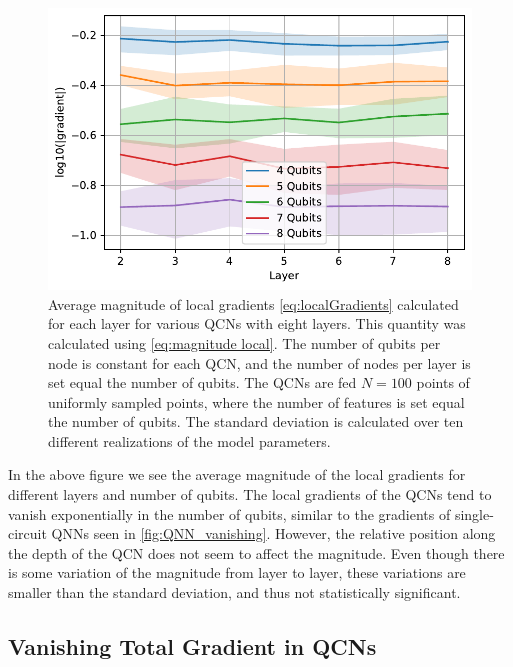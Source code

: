 \begin{figure}[H]
    \centering
    \includegraphics[width=12cm]{latex/figures/vanishing_gradient_partial_input.pdf}
    \caption{Average magnitude of local gradients \cref{eq:localGradients} calculated for each layer for various QCNs with eight layers. This quantity was calculated using \cref{eq:magnitude local}. The number of qubits per node is constant for each QCN, and the number of nodes per layer is set equal the number of qubits. The QCNs are fed $N=100$ points of uniformly sampled points, where the number of features is set equal the number of qubits. The standard deviation is calculated over ten different realizations of the model parameters.}
    \label{fig:QCN_local_vanishing}
\end{figure}

In the above figure we see the average magnitude of the local gradients for different layers and number of qubits. The local gradients of the QCNs tend to vanish exponentially in the number of qubits, similar to the gradients of single-circuit QNNs seen in \cref{fig:QNN_vanishing}. However, the relative position along the depth of the QCN does not seem to affect the magnitude. Even though there is some variation of the magnitude from layer to layer, these variations are smaller than the standard deviation, and thus not statistically significant.

\subsection{Vanishing Total Gradient in QCNs}\label{sec:Vanishing Total Gradients in QCNs}


